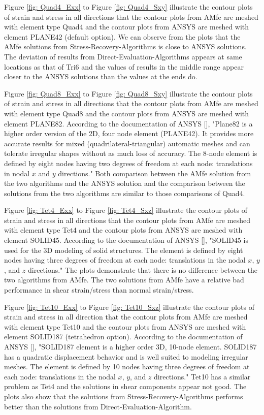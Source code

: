 Figure \ref{fig: Quad4_Exx} to Figure \ref{fig: Quad4_Sxy} illustrate the contour plots of strain and stress in all directions that the contour plots from AMfe are meshed with element type Quad4 and the contour plots from ANSYS are meshed with element PLANE42 (default option). We can observe from the plots that the AMfe solutions from Stress-Recovery-Algorithms is close to ANSYS solutions. The deviation of results from Direct-Evaluation-Algorithms appears at same locations as that of Tri6 and the values of results in the middle range appear closer to the ANSYS solutions than the values at the ends do.

Figure \ref{fig: Quad8_Exx} to Figure \ref{fig: Quad8_Sxy} illustrate the contour plots of strain and stress in all directions that the contour plots from AMfe are meshed with element type Quad8 and the contour plots from ANSYS are meshed with element PLANE82. According to the documentation of ANSYS [\cite{APDL}], "Plane82 is a higher order version of the 2D, four node element (PLANE42). It provides more accurate results for mixed (quadrilateral-triangular) automatic meshes and can tolerate irregular shapes without as much loss of accuracy. The 8-node element is defined by eight nodes having two degrees of freedom at each node: translations in nodal $x$ and $y$ directions." Both comparison between the AMfe solution from the two algorithms and the ANSYS solution and the comparison between the solutions from the two algorithms are similar to those comparisons of Quad4. 

Figure \ref{fig: Tet4_Exx} to Figure \ref{fig: Tet4_Sxz} illustrate the contour plots of strain and stress in all directions that the contour plots from AMfe are meshed with element type Tet4 and the contour plots from ANSYS are meshed with element SOLID45. According to the documentation of ANSYS [\cite{APDL}], "SOLID45 is used for the 3D modeling of solid structures. The element is defined by eight nodes having three degrees of freedom at each node: translations in the nodal $x$, $y$, and $z$ directions." The plots demonstrate that there is no difference between the two algorithms from AMfe. The two solutions from AMfe have a relative bad performance in shear strain/stress than normal strain/stress. 

Figure \ref{fig: Tet10_Exx} to Figure \ref{fig: Tet10_Sxz} illustrate the contour plots of strain and stress in all direction that the contour plots from AMfe are meshed with element type Tet10 and the contour plots from ANSYS are meshed with element SOLID187 (tetrahedron option). According to the documentation of ANSYS [\cite{APDL}], "SOLID187 element is a higher order 3D, 10-node element. SOLID187 has a quadratic displacement behavior and is well suited to modeling irregular meshes. The element is defined by 10 nodes having three degrees of freedom at each node: translations in the nodal $x$, $y$, and $z$ directions." Tet10 has a similar problem as Tet4 and the solutions in shear components appear not good. The plots also show that the solutions from Stress-Recovery-Algorithms performs better than the solutions from Direct-Evaluation-Algorithm. 

